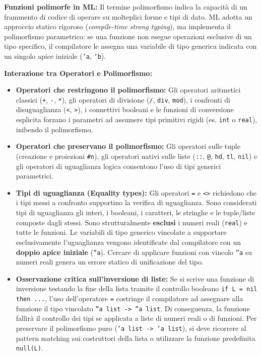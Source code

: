 \documentclass[12pt, a4paper]{article}
\begin{document}
\textbf{Funzioni polimorfe in ML:}
Il termine polimorfismo indica la capacità di un frammento di codice di operare su molteplici forme e tipi di dato. ML adotta un approccio statico rigoroso (\textit{compile-time strong typing}), ma implementa il polimorfismo parametrico: se una funzione non esegue operazioni esclusive di un tipo specifico, il compilatore le assegna una variabile di tipo generica indicata con un singolo apice iniziale (\texttt{'a}, \texttt{'b}).

\textbf{Interazione tra Operatori e Polimorfismo:}
\begin{itemize}
    \item \textbf{Operatori che restringono il polimorfismo:} Gli operatori aritmetici classici (\texttt{+}, \texttt{-}, \texttt{*}), gli operatori di divisione (\texttt{/}, \texttt{div}, \texttt{mod}), i confronti di disuguaglianza (\texttt{<}, \texttt{>}), i connettivi booleani e le funzioni di conversione esplicita forzano i parametri ad assumere tipi primitivi rigidi (es. \texttt{int} o \texttt{real}), inibendo il polimorfismo.
    \item \textbf{Operatori che preservano il polimorfismo:} Gli operatori sulle tuple (creazione e proiezioni \texttt{\#n}), gli operatori nativi sulle liste (\texttt{::}, \texttt{@}, \texttt{hd}, \texttt{tl}, \texttt{nil}) e gli operatori di uguaglianza logica consentono l'uso di tipi generici parametrici.
    \item \textbf{Tipi di uguaglianza (Equality types):} Gli operatori \texttt{=} e \texttt{<>} richiedono che i tipi messi a confronto supportino la verifica di uguaglianza. Sono considerati tipi di uguaglianza gli interi, i booleani, i caratteri, le stringhe e le tuple/liste composte dagli stessi. Sono strutturalmente \textbf{esclusi} i numeri reali (\texttt{real}) e tutte le funzioni. 
    Le variabili di tipo generico vincolate a supportare esclusivamente l'uguaglianza vengono identificate dal compilatore con un \textbf{doppio apice iniziale} (\texttt{''a}). Cercare di applicare funzioni con vincolo \texttt{''a} su numeri reali genera un errore statico di unificazione del tipo.
    \item \textbf{Osservazione critica sull'inversione di liste:} Se si scrive una funzione di inversione testando la fine della lista tramite il controllo booleano \texttt{if L = nil then ...}, l'uso dell'operatore \texttt{=} costringe il compilatore ad assegnare alla funzione il tipo vincolato \texttt{''a list -> ''a list}. Di conseguenza, la funzione fallirà il controllo dei tipi se applicata a liste di numeri reali o di funzioni. Per preservare il polimorfismo puro (\texttt{'a list -> 'a list}), si deve ricorrere al pattern matching sui costruttori della lista o utilizzare la funzione predefinita \texttt{null(L)}.
\end{itemize}
\end{document}
